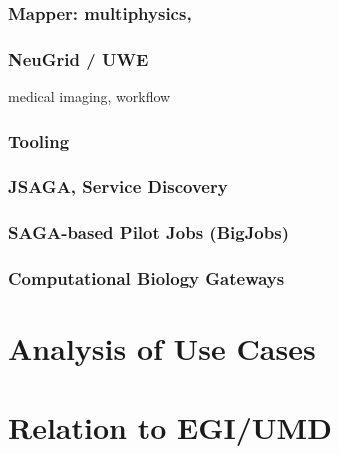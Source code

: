 \documentclass[12pt]{article}
\begin{document}
\subsubsection*{Mapper: multiphysics,}
\subsubsection*{NeuGrid / UWE} medical imaging, workflow

\subsubsection{Tooling}
 \subsubsection*{JSAGA, Service Discovery}
 \subsubsection*{SAGA-based Pilot Jobs (BigJobs)}
 \subsubsection*{Computational Biology Gateways}


\section{Analysis of Use Cases}

\section{Relation to EGI/UMD}



\end{document}
